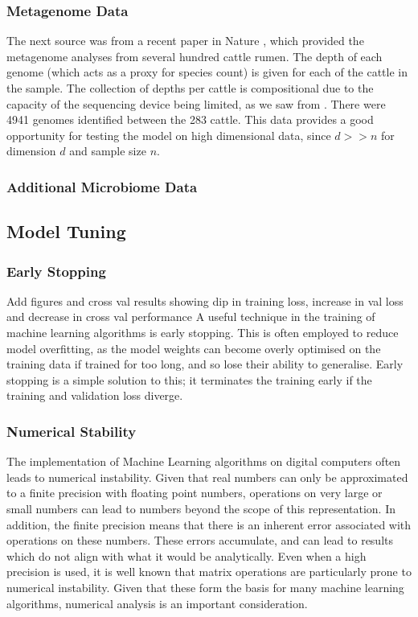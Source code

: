 \subsubsection{Metagenome Data}
The next source was from a recent paper in Nature \citep{Stewart2019}, which provided the metagenome analyses from several hundred cattle rumen. The depth of each genome (which acts as a proxy for species count) is given for each of the cattle in the sample. The collection of depths per cattle is compositional due to the capacity of the sequencing device being limited, as we saw from \cite{Gloor2017}. There were 4941 genomes identified between the 283 cattle. This data provides a good opportunity for testing the model on high dimensional data, since $d >> n$ for dimension $d$ and sample size $n$.  

\subsubsection{Additional Microbiome Data}


\subsection{Model Tuning}
\subsubsection{Early Stopping}
Add figures and cross val results showing dip in training loss, increase in val loss and decrease in cross val performance
A useful technique in the training of machine learning algorithms is early stopping. This is often employed to reduce model overfitting, as the model weights can become overly optimised on the training data if trained for too long, and so lose their ability to generalise. Early stopping is a simple solution to this; it terminates the training early if the training and validation loss diverge. 



\subsubsection{Numerical Stability}
The implementation of Machine Learning algorithms on digital computers often leads to numerical instability. Given that real numbers can only be approximated to a finite precision with floating point numbers, operations on very large or small numbers can lead to numbers beyond the scope of this representation. In addition, the finite precision means that there is an inherent error associated with operations on these numbers. These errors accumulate, and can lead to results which do not align with what it would be analytically. Even when a high precision is used, it is well known that matrix operations are particularly prone to numerical instability. Given that these form the basis for many machine learning algorithms, numerical analysis is an important consideration.

